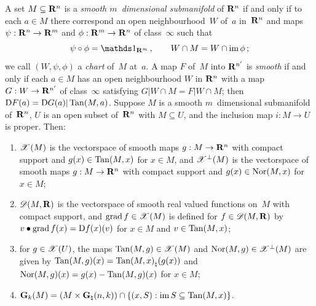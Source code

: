 \begin{definition}
    \label{al:2.5}
    A set $M \subseteq \mathbf{R}^{n}$ is a \emph{smooth $m$~dimensional submanifold} of
    $\mathbf{R}^{n}$ if and only if to each $a \in M$ there correspond an open neighbourhood~$W$
    of~$a$ in~$\mathbf{R}^{n}$ and maps $\psi : \mathbf{R}^{n} \to \mathbf{R}^m$ and $\phi : \mathbf{R}^m \to
    \mathbf{R}^{n}$ of class~$\infty$ such that
    \begin{displaymath}
        \psi \circ \phi = \id{\R^m} \,, \qquad W \cap M = W \cap \im \phi \,;
    \end{displaymath}
    we call $(W,\psi,\phi)$ a \emph{chart} of~$M$ at~$a$. A map $F$ of~$M$ into $\mathbf{R}^{n'}$ is
    \emph{smooth} if and only if each $a \in M$ has an open neighbourhood $W$ in $\mathbf{R}^{n}$
    with a map $G : W \to \mathbf{R}^{n'}$ of class~$\infty$ satisfying $G | W \cap M = F | W \cap
    M$; then $\mathrm{D} F(a) = \mathrm{D} G(a) | \operatorname{Tan}(M,a)$. Suppose $M$ is a smooth $m$~dimensional
    submanifold of~$\mathbf{R}^{n}$, $U$ is an open subset of~$\mathbf{R}^{n}$ with $M \subseteq U$,
    and the inclusion map $i : M \to U$ is proper. Then:
    \begin{enumerate}
        \item $\mathscr{X}(M)$ is the vectorspace of smooth maps $g : M \to \mathbf{R}^{n}$ with compact
            support and $g(x) \in \operatorname{Tan}(M,x)$ for $x \in M$, and $\mathscr{X}^{\perp}(M)$ is the
            vectorspace of smooth maps $g : M \to \mathbf{R}^{n}$ with compact support and $g(x)
            \in \operatorname{Nor}(M,x)$ for $x \in M$;
        \item $\mathscr{D}(M,\mathbf{R})$ is the vectorspace of smooth real valued functions on~$M$ with
            compact support, and $\operatorname{grad} f \in \mathscr{X}(M)$ is defined for $f \in \mathscr{D}(M,\mathbf{R})$ by
            $v \bullet \operatorname{grad} f(x) = \mathrm{D} f(x)(v)$ for $x \in M$ and $v \in \operatorname{Tan}(M,x)$;
        \item for $g \in \mathscr{X}(U)$, the maps $\operatorname{Tan}(M,g) \in \mathscr{X}(M)$ and $\operatorname{Nor}(M,g) \in
            \mathscr{X}^\perp(M)$ are given by $\operatorname{Tan}(M,g)(x) = {\operatorname{Tan}(M,x)}_\natural(g(x))$ and
            $\operatorname{Nor}(M,g)(x) = g(x) - \operatorname{Tan}(M,g)(x)$ for $x \in M$;
        \item $\mathbf{G}_{k}(M) = (M \times \mathbf{G}_{\natural}(n,k)) \cap \{ (x,S) : \operatorname{im} S \subseteq
            \operatorname{Tan}(M,x) \}$.
    \end{enumerate}
\end{definition}

